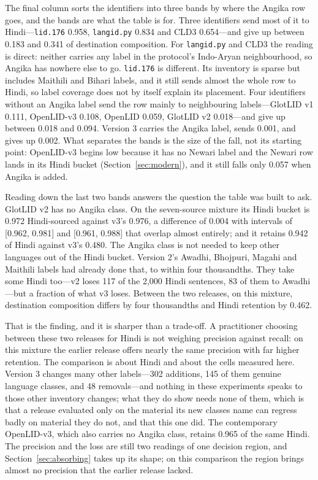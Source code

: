 \documentclass[final]{clv2025}
\newcommand{\lab}[1]{\texttt{#1}}
\begin{document}
The final column sorts the identifiers into three bands by where the Angika row goes, and the bands are what the table is for. Three identifiers send most of it to Hindi---\lab{lid.176} 0.958, \texttt{langid.py} 0.834 and CLD3 0.654---and give up between 0.183 and 0.341 of destination composition. For \texttt{langid.py} and CLD3 the reading is direct: neither carries any label in the protocol's Indo-Aryan neighbourhood, so Angika has nowhere else to go. \lab{lid.176} is different. Its inventory is sparse but includes Maithili and Bihari labels, and it still sends almost the whole row to Hindi, so label coverage does not by itself explain its placement. Four identifiers without an Angika label send the row mainly to neighbouring labels---GlotLID v1 0.111, OpenLID-v3 0.108, OpenLID 0.059, GlotLID v2 0.018---and give up between 0.018 and 0.094. Version 3 carries the Angika label, sends 0.001, and gives up 0.002. What separates the bands is the size of the fall, not its starting point: OpenLID-v3 begins low because it has no Newari label and the Newari row lands in its Hindi bucket (Section~\ref{sec:modern}), and it still falls only 0.057 when Angika is added.

Reading down the last two bands answers the question the table was built to ask. GlotLID v2 has no Angika class. On the seven-source mixture its Hindi bucket is 0.972 Hindi-sourced against v3's 0.976, a difference of 0.004 with intervals of [0.962, 0.981] and [0.961, 0.988] that overlap almost entirely; and it retains 0.942 of Hindi against v3's 0.480. The Angika class is not needed to keep other languages out of the Hindi bucket. Version 2's Awadhi, Bhojpuri, Magahi and Maithili labels had already done that, to within four thousandths. They take some Hindi too---v2 loses 117 of the 2,000 Hindi sentences, 83 of them to Awadhi---but a fraction of what v3 loses. Between the two releases, on this mixture, destination composition differs by four thousandths and Hindi retention by 0.462.

That is the finding, and it is sharper than a trade-off. A practitioner choosing between these two releases for Hindi is not weighing precision against recall: on this mixture the earlier release offers nearly the same precision with far higher retention. The comparison is about Hindi and about the cells measured here. Version 3 changes many other labels---302 additions, 145 of them genuine language classes, and 48 removals---and nothing in these experiments speaks to those other inventory changes; what they do show needs none of them, which is that a release evaluated only on the material its new classes name can regress badly on material they do not, and that this one did. The contemporary OpenLID-v3, which also carries no Angika class, retains 0.965 of the same Hindi. The precision and the loss are still two readings of one decision region, and Section~\ref{sec:absorbing} takes up its shape; on this comparison the region brings almost no precision that the earlier release lacked.
\end{document}
